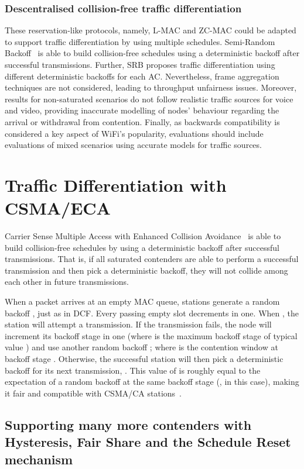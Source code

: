 \documentclass[a4paper]{article}
\begin{document}
\subsubsection{Descentralised collision-free traffic differentiation}
These reservation-like protocols, namely, L-MAC and ZC-MAC could be adapted to support traffic differentiation by using multiple schedules. Semi-Random Backoff~\cite{HE} is able to build collision-free schedules using a deterministic backoff after successful transmissions. Further, SRB proposes traffic differentiation using different deterministic backoffs for each AC. Nevertheless, frame aggregation techniques are not considered, leading to throughput unfairness issues. Moreover, results for non-saturated scenarios do not follow realistic traffic sources for voice and video, providing inaccurate modelling of nodes' behaviour regarding the arrival or withdrawal from contention. Finally, as backwards compatibility is considered a key aspect of WiFi's popularity, evaluations should include evaluations of mixed scenarios using accurate models for traffic sources.

\section{Traffic Differentiation with CSMA/ECA}\label{section3}
Carrier Sense Multiple Access with Enhanced Collision Avoidance~\cite{sanabria2014high, research2standards} is able to build collision-free schedules by using a deterministic backoff after successful transmissions. That is, if all saturated contenders are able to perform a successful transmission and then pick a deterministic backoff, they will not collide among each other in future transmissions.
	
When a packet arrives at an empty MAC queue, stations generate a random backoff , just as in DCF. Every passing empty slot decrements  in one. When , the station will attempt a transmission. If the transmission fails, the node will increment its backoff stage  in one (where  is the maximum backoff stage of typical value ) and use another random backoff ; where  is the contention window at backoff stage . Otherwise, the successful station will then pick a deterministic backoff for its next transmission, . This value of  is roughly equal to the expectation of a random backoff at the same backoff stage (, in this case), making it fair and compatible with CSMA/CA stations~\cite{research2standards}.

\subsection{Supporting many more contenders with Hysteresis, Fair Share and the Schedule Reset mechanism}\label{scheduleReset}
\end{document}
